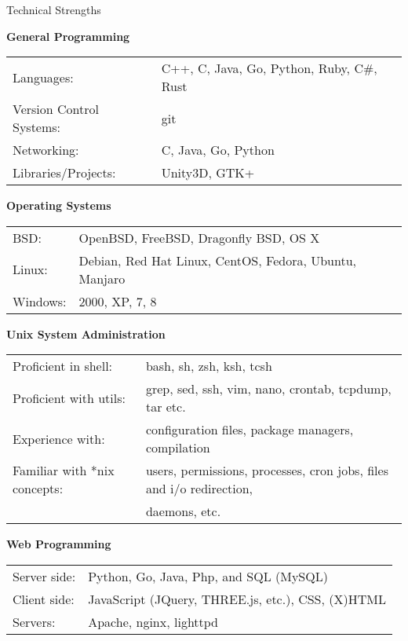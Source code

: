 \documentclass{resume} %
\newcommand{\btab}[2]{
	\bgroup
	\def\arraystretch{#1}
	\begin{tabular}{#2}
}
\newcommand{\etab}{
	\end{tabular} \smallskip
	\egroup
}
\begin{document}
\begin{rSection}{Technical Strengths}

{\bf General Programming}

\btab{1.1}{ l l }
	Languages: & C++, C, Java, Go, Python, Ruby, C\#, Rust \\
	Version Control Systems: & git \\
	Networking: & C, Java, Go, Python \\
	Libraries/Projects: & Unity3D, GTK+ \\
\etab

{\bf Operating Systems}

\btab{1.1}{ l l }
	BSD: & OpenBSD, FreeBSD, Dragonfly BSD, OS X \\
	Linux: & Debian, Red Hat Linux, CentOS, Fedora, Ubuntu, Manjaro \\
	Windows: & 2000, XP, 7, 8
\etab

{\bf Unix System Administration}

\btab{1.1}{ l l }
	Proficient in shell: & bash, sh, zsh, ksh, tcsh \\
	Proficient with utils: & grep, sed, ssh, vim, nano, crontab, tcpdump, tar etc. \\
	Experience with: & configuration files, package managers, compilation \\
	Familiar with *nix concepts: & users, permissions, processes, cron jobs, files and i/o redirection, \\
	& daemons, etc.
\etab

{\bf Web Programming}

\btab{1.1}{ l l }
	Server side: & Python, Go, Java, Php, and SQL (MySQL) \\
	Client side: & JavaScript (JQuery, THREE.js, etc.), CSS, (X)HTML \\
	Servers: & Apache, nginx, lighttpd \\
\etab

\end{rSection}
\end{document}
